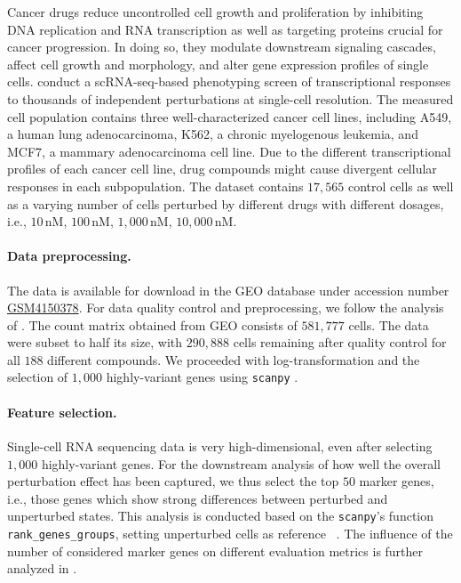  Cancer drugs reduce uncontrolled cell growth and proliferation by inhibiting DNA replication and RNA transcription as well as targeting proteins crucial for cancer progression. In doing so, they modulate downstream signaling cascades, affect cell growth and morphology, and alter gene expression profiles of single cells. 
\citet{srivatsan2020massively} conduct a scRNA-seq-based phenotyping screen of transcriptional responses to thousands of independent perturbations at single-cell resolution.
The measured cell population contains three well-characterized cancer cell lines, including A549, a human lung adenocarcinoma, K562, a chronic myelogenous leukemia, and MCF7, a mammary adenocarcinoma cell line.
Due to the different transcriptional profiles of each cancer cell line, drug compounds might cause divergent cellular responses in each subpopulation.
The dataset contains $17,565$ control cells as well as a varying number of cells perturbed by different drugs with different dosages, i.e., $10\,$nM, $100\,$nM, $1,000\,$nM, $10,000\,$nM.

\paragraph{Data preprocessing.}
The data is available for download in the \acrfull{GEO} database under accession number \href{https://www.ncbi.nlm.nih.gov/geo/query/acc.cgi?acc=GSM4150378}{GSM4150378}.
For data quality control and preprocessing, we follow the analysis of \citet{lotfollahi2021compositional}. The count matrix obtained from GEO consists of $581,777$ cells. The data were subset to half its size, with $290,888$ cells remaining after quality control for all $188$ different compounds. We proceeded with log-transformation and the selection of $1,000$ highly-variant genes using \texttt{scanpy} \citep{wolf2018scanpy}.

\paragraph{Feature selection.}
Single-cell RNA sequencing data is very high-dimensional, even after selecting $1,000$ highly-variant genes.
For the downstream analysis of how well the overall perturbation effect has been captured, we thus select the top $50$ marker genes, i.e., those genes which show strong differences between perturbed and unperturbed states. This analysis is conducted based on the \texttt{scanpy}'s function \texttt{rank\_genes\_groups}, setting unperturbed cells as reference ~\citep{wolf2018scanpy}. The influence of the number of considered marker genes on different evaluation metrics is further analyzed in \citet{bunne2021learning}.

